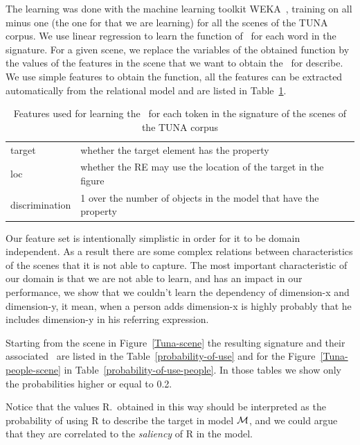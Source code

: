 The learning was done with the machine learning toolkit WEKA~\cite{Hall:WEK09}, training on all minus one (the one for that we are learning) for all the scenes of the TUNA corpus. We use linear regression to learn the function of \puse\ for each word in the signature. 
For a given scene, we replace the variables of the obtained function by the values of the features in the scene that we want to obtain the \puse\ for describe. 
We use simple features to obtain the function, all the features can be extracted automatically from the relational model and are listed 
in Table~\ref{features}.  
\vspace*{-.3cm}
\begin{table}[htbp]
\begin{center}
\begin{tabular}{|l|p{10cm}|}
\hline
target & whether the target element has the property \\
loc & whether the RE may use the location of the target in the figure\\
discrimination & 1 over the number of objects in the model that have the property \\
\hline
\end{tabular}
\vspace*{.03cm}
\caption{Features used for learning the \puse~for each token in the signature of the scenes of the TUNA corpus} 
\label{features}
\end{center}
\end{table}
\vspace*{-.9cm}
Our feature set is intentionally simplistic in order for it to be domain independent. As a result there are some complex relations 
between characteristics of the scenes that it is not able to capture. The most important characteristic of our domain is that we are not able 
to learn, and has an impact in our performance, we show that we couldn't learn the dependency of dimension-x and dimension-y, it mean, when a person adds dimension-x is highly probably that he includes dimension-y in his referring expression. 

Starting from the scene in Figure~\ref{Tuna-scene}
the resulting signature and their associated \puse\ are listed in the Table~\ref{probability-of-use} and for the Figure~\ref{Tuna-people-scene} in Table~\ref{probability-of-use-people}. In those tables we show only the probabilities higher or equal to 0.2.

Notice that the values R.\puse\ obtained in this way should be interpreted as the probability of using R to describe the target in model 
$\mathcal{M}$, and we could argue that they are correlated to the \emph{saliency} of R in the model.  



